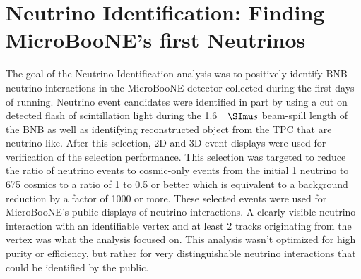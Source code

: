 \chapter{Neutrino Identification: Finding MicroBooNE's first Neutrinos} \label{ch:neutrinoID}
The goal of the Neutrino Identification analysis was to positively identify BNB neutrino interactions in the MicroBooNE detector collected during the first days of running. Neutrino event candidates were identified in part by using a cut on detected flash of scintillation light during the 1.6 $\micro s$ beam-spill length of the BNB as well as identifying reconstructed object from the TPC that are neutrino like. After this selection, 2D and 3D event displays were used for verification of the selection performance. This selection was targeted to reduce the ratio of neutrino events to cosmic-only events from the initial 1 neutrino to 675 cosmics to a ratio of 1 to 0.5 or better which is equivalent to a background reduction by a factor of 1000 or more. These selected events were used for MicroBooNE's public displays of neutrino interactions. A clearly visible neutrino interaction with an identifiable vertex and at least 2 tracks originating from the vertex was what the analysis focused on. This analysis wasn't optimized for high purity or efficiency, but rather for very distinguishable neutrino interactions that could be identified by the public.
\section{} 
